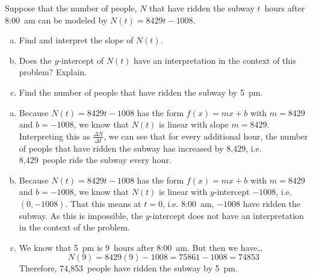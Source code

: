 \documentclass[11pt,letterpaper]{article}
\begin{document}
 Suppose that the number of people, $N$ that have ridden the subway $t$~hours after 8:00~am can be modeled by $N(t)= 8429t - 1008$. 
	\begin{enumerate}[(a)]
	\item Find and interpret the slope of $N(t)$.
	\item Does the $y$-intercept of $N(t)$ have an interpretation in the context of this problem? Explain.
	\item Find the number of people that have ridden the subway by 5~pm. 
	\end{enumerate} \pspace

\sol 
\begin{enumerate}[(a)]
\item Because $N(t)= 8429t - 1008$ has the form $f(x)= mx + b$ with $m= 8429$ and $b= -1008$, we know that $N(t)$ is linear with slope $m= 8429$. Interpreting this as $\frac{\Delta N}{\Delta t}$, we can see that for every additional hour, the number of people that have ridden the subway has increased by 8,429, i.e. 8,429~people ride the subway every hour. \pspace

\item Because $N(t)= 8429t - 1008$ has the form $f(x)= mx + b$ with $m= 8429$ and $b= -1008$, we know that $N(t)$ is linear with $y$-intercept $-1008$, i.e. $(0, -1008)$. That this means at $t= 0$, i.e. 8:00~am, $-1008$ have ridden the subway. As this is impossible, the $y$-intercept does not have an interpretation in the context of the problem. \pspace

\item We know that 5~pm is 9~hours after 8:00~am. But then we have\dots
	\[
	N(9)= 8429(9) - 1008= 75861 - 1008= 74853
	\]
Therefore, 74,853~people have ridden the subway by 5~pm. 
\end{enumerate}
\end{document}

